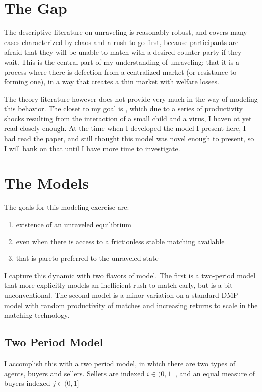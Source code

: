 \documentclass[WP]{AEA}
\begin{document}
\section{The Gap}

The descriptive literature on unraveling is reasonably robust, and covers many cases characterized by chaos and a rush to go first, because participants are afraid that they will be unable to match with a desired counter party if they wait. This is the central part of my understanding of unraveling: that it is a process where there is defection from a centralized market (or resistance to forming one), in a way that creates a thin market with welfare losses.  

The theory literature however does not provide very much in the way of modeling this behavior.  The closet to my goal is \cite{Halaburda2010}, which due to a series of productivity shocks resulting from the interaction of a small child and a virus, I haven ot yet read closely enough.  At the time when I developed the model I present here, I had read the paper, and still thought this model was novel enough to present, so I will bank on that until I have more time to investigate.


\section{The Models}
The goals for this modeling exercise are:
\begin{enumerate}
	\item  existence of an unraveled equilibrium
	\item  even when there is access to a frictionless stable matching available
	\item  that is pareto preferred to the unraveled state
\end{enumerate}

I capture this dynamic with two flavors of model. The first is a two-period model that more explicitly models an inefficient rush to match early, but is a bit unconventional. The second model is a minor variation on a standard DMP model with random productivity of matches and increasing returns to scale in the matching technology.  


\subsection{Two Period Model}
I accomplish this with a two period model, in which there are two types of agents, buyers and sellers.
Sellers are indexed $i \in (0,1]$ , and an equal measure of buyers indexed $j \in (0,1]$
\end{document}

